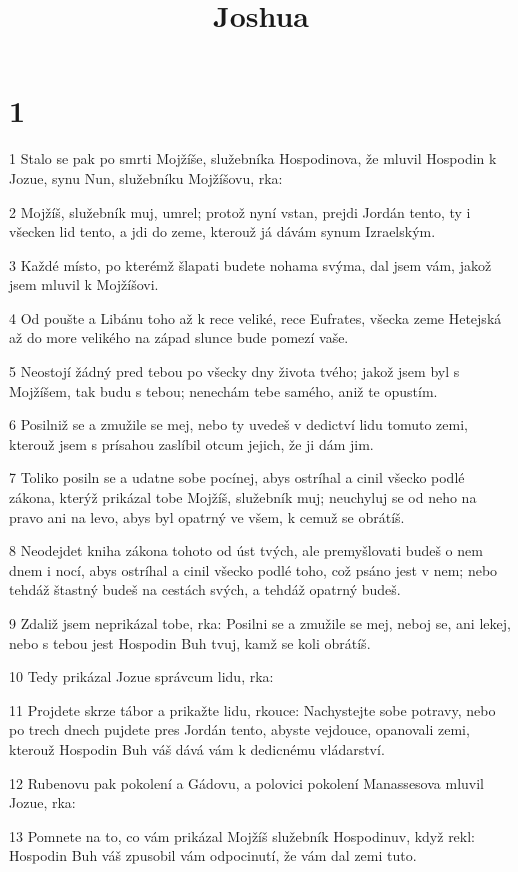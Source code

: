 

\title{Joshua}

\chapter{1}

\par 1 Stalo se pak po smrti Mojžíše, služebníka Hospodinova, že mluvil Hospodin k Jozue, synu Nun, služebníku Mojžíšovu, rka:
\par 2 Mojžíš, služebník muj, umrel; protož nyní vstan, prejdi Jordán tento, ty i všecken lid tento, a jdi do zeme, kterouž já dávám synum Izraelským.
\par 3 Každé místo, po kterémž šlapati budete nohama svýma, dal jsem vám, jakož jsem mluvil k Mojžíšovi.
\par 4 Od poušte a Libánu toho až k rece veliké, rece Eufrates, všecka zeme Hetejská až do more velikého na západ slunce bude pomezí vaše.
\par 5 Neostojí žádný pred tebou po všecky dny života tvého; jakož jsem byl s Mojžíšem, tak budu s tebou; nenechám tebe samého, aniž te opustím.
\par 6 Posilniž se a zmužile se mej, nebo ty uvedeš v dedictví lidu tomuto zemi, kterouž jsem s prísahou zaslíbil otcum jejich, že ji dám jim.
\par 7 Toliko posiln se a udatne sobe pocínej, abys ostríhal a cinil všecko podlé zákona, kterýž prikázal tobe Mojžíš, služebník muj; neuchyluj se od neho na pravo ani na levo, abys byl opatrný ve všem, k cemuž se obrátíš.
\par 8 Neodejdet kniha zákona tohoto od úst tvých, ale premyšlovati budeš o nem dnem i nocí, abys ostríhal a cinil všecko podlé toho, což psáno jest v nem; nebo tehdáž štastný budeš na cestách svých, a tehdáž opatrný budeš.
\par 9 Zdaliž jsem neprikázal tobe, rka: Posilni se a zmužile se mej, neboj se, ani lekej, nebo s tebou jest Hospodin Buh tvuj, kamž se koli obrátíš.
\par 10 Tedy prikázal Jozue správcum lidu, rka:
\par 11 Projdete skrze tábor a prikažte lidu, rkouce: Nachystejte sobe potravy, nebo po trech dnech pujdete pres Jordán tento, abyste vejdouce, opanovali zemi, kterouž Hospodin Buh váš dává vám k dedicnému vládarství.
\par 12 Rubenovu pak pokolení a Gádovu, a polovici pokolení Manassesova mluvil Jozue, rka:
\par 13 Pomnete na to, co vám prikázal Mojžíš služebník Hospodinuv, když rekl: Hospodin Buh váš zpusobil vám odpocinutí, že vám dal zemi tuto.
